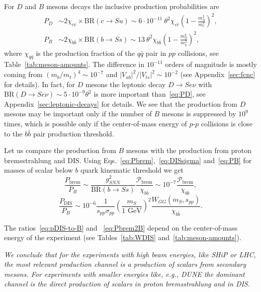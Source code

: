 \documentclass[a4paper,12pt,dvipsnames,usernames]{article}
\begin{document}
For $D$ and $B$ mesons decays the inclusive production probabilities are~\cite{Chivukula:1988gp,Evans:2017lvd}
\begin{align}
    P_{D} &\sim 2\chi_{c\bar{c}} \times \text{BR}(c\to Su) \sim 6\cdot 10^{-11} \ \theta^{2} \chi_{c\bar{c}} \left( 1-\frac{m_{S}^{2}}{m_{c}^{2}}\right)^{2},
    \label{eq:PD}
    \\
    P_{B} &\sim 2\chi_{b\bar{b}} \times \text{BR}(b\to Ss) \sim 13 \ \theta^{2}\chi_{b\bar{b}}\left( 1-\frac{m_{S}^{2}}{m_{b}^{2}}\right)^{2},
    \label{eq:PB}
\end{align}
where $\chi_{q\bar{q}}$ is the production fraction of the $q\bar{q}$ pair in $pp$ collisions, see Table~\ref{tab:meson-amounts}. The difference in $10^{-11}$ orders of magnitude is mostly coming from  $(m_b/m_t)^4\sim 10^{-7}$  and $|V_{ub}|^2/|V_{ts}|^2\sim 10^{-2}$ (see Appendix~\ref{sec:fcnc} for details). 
In fact, for $D$ mesons the leptonic decay $D\to S e\nu$ with $\text{BR}(D\to S e\nu)\sim 5\cdot 10^{-9}\theta^{2}$ is more important than~\eqref{eq:PD}, see Appendix~\ref{sec:leptonic-decays} for details. We see that the production from $D$ mesons may be important only if the number of $B$ mesons is suppressed by $10^9$ times, which is possible only if the center-of-mass energy of $p$-$p$ collisions is close to the $b\bar{b}$ pair production threshold. 

Let us compare the production from $B$ mesons with the production from proton bremsstrahlung and DIS. Using Eqs.~\eqref{eq:Pbrem},~\eqref{eq:DISsigma} and~\eqref{eq:PB} for masses of scalar below $b$ quark kinematic threshold we get
\begin{equation}
  \frac{P_{\text{brem}}}{P_{B}} \sim \frac{g_{SNN}^2}{\text{BR}(b\to Ss)} \frac{\mathcal{P}_{\text{brem}}}{\chi_{b\bar{b}}} \sim 10^{-7} \frac{\mathcal{P}_{\text{brem}}}{\chi_{b\bar{b}}},
  \label{eq:Pbrem2B}
\end{equation}
\begin{equation}
    \frac{P_{\text{DIS}}}{P_{B}} 
    \sim 10^{-6} \frac{1}{s_{pp} \sigma_{pp}} \left(\frac{m_S}{1\text{ GeV}}\right)^2
    \frac{W_{GG}(m_S,s_{pp})}{\chi_{b\bar{b}}}.
    \label{eq:pDIS-to-B}
\end{equation}

The ratios~\eqref{eq:pDIS-to-B} and ~\eqref{eq:Pbrem2B} depend on the center-of-mass energy of the experiment
(see  Tables~\ref{tab:WDIS} and~\ref{tab:meson-amounts}).

\emph{We conclude that for the experiments with high beam energies, like SHiP or LHC, the most relevant production channel is a production of scalars from secondary mesons. For experiments with smaller energies like, e.g., DUNE the dominant channel is the direct production  of scalars in proton bremsstrahlung and in DIS.}
\end{document}
